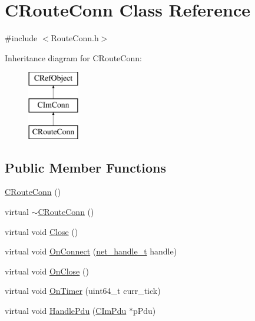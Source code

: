 \hypertarget{class_c_route_conn}{}\section{C\+Route\+Conn Class Reference}
\label{class_c_route_conn}


{\ttfamily \#include $<$Route\+Conn.\+h$>$}

Inheritance diagram for C\+Route\+Conn\+:\begin{figure}[H]
\begin{center}
\leavevmode
\includegraphics[height=3.000000cm]{class_c_route_conn}
\end{center}
\end{figure}
\subsection*{Public Member Functions}
\begin{DoxyCompactItemize}
\item 
\hyperlink{class_c_route_conn_ad27a95f2316b6d0f44e06d33e2f5ed84}{C\+Route\+Conn} ()
\item 
virtual \hyperlink{class_c_route_conn_a912db30a4e775dfdcac5256597176364}{$\sim$\+C\+Route\+Conn} ()
\item 
virtual void \hyperlink{class_c_route_conn_a1554dfae52fe708d961f698f3c47d344}{Close} ()
\item 
virtual void \hyperlink{class_c_route_conn_aaf5025530ca91ff3e6307f6f1ac31907}{On\+Connect} (\hyperlink{base_2ostype_8h_a5e1697fa312aa00ac7305460abf166fd}{net\+\_\+handle\+\_\+t} handle)
\item 
virtual void \hyperlink{class_c_route_conn_a6b427b820f848308eade0846c899a443}{On\+Close} ()
\item 
virtual void \hyperlink{class_c_route_conn_a6c7743642e12f8a721ffb724680b45aa}{On\+Timer} (uint64\+\_\+t curr\+\_\+tick)
\item 
virtual void \hyperlink{class_c_route_conn_a8b55e37d8d613034f4a0f1d13d471e5c}{Handle\+Pdu} (\hyperlink{class_c_im_pdu}{C\+Im\+Pdu} $\ast$p\+Pdu)
\end{DoxyCompactItemize}
